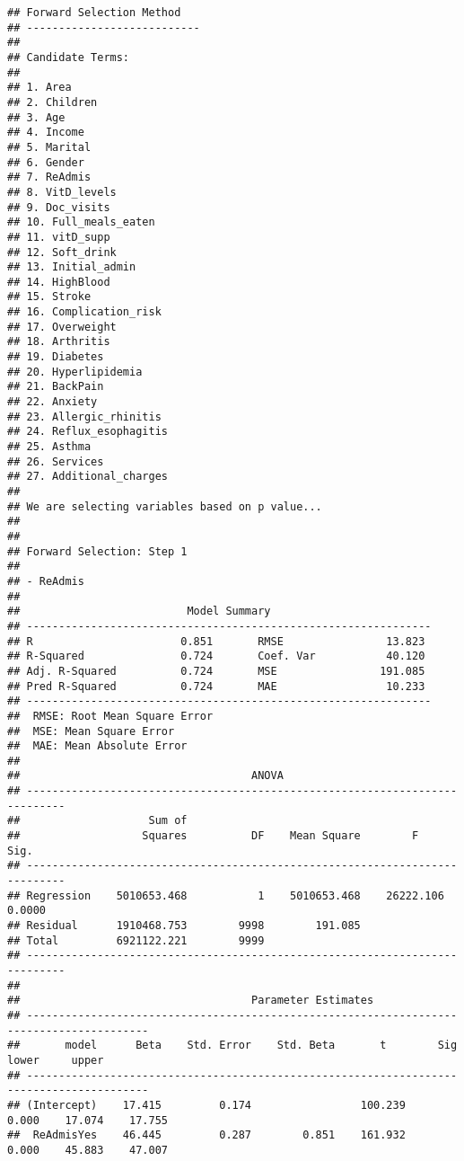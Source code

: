 \documentclass[
]{article}
\begin{document}
\begin{verbatim}
## Forward Selection Method    
## ---------------------------
## 
## Candidate Terms: 
## 
## 1. Area 
## 2. Children 
## 3. Age 
## 4. Income 
## 5. Marital 
## 6. Gender 
## 7. ReAdmis 
## 8. VitD_levels 
## 9. Doc_visits 
## 10. Full_meals_eaten 
## 11. vitD_supp 
## 12. Soft_drink 
## 13. Initial_admin 
## 14. HighBlood 
## 15. Stroke 
## 16. Complication_risk 
## 17. Overweight 
## 18. Arthritis 
## 19. Diabetes 
## 20. Hyperlipidemia 
## 21. BackPain 
## 22. Anxiety 
## 23. Allergic_rhinitis 
## 24. Reflux_esophagitis 
## 25. Asthma 
## 26. Services 
## 27. Additional_charges 
## 
## We are selecting variables based on p value...
## 
## 
## Forward Selection: Step 1 
## 
## - ReAdmis 
## 
##                          Model Summary                          
## ---------------------------------------------------------------
## R                       0.851       RMSE                13.823 
## R-Squared               0.724       Coef. Var           40.120 
## Adj. R-Squared          0.724       MSE                191.085 
## Pred R-Squared          0.724       MAE                 10.233 
## ---------------------------------------------------------------
##  RMSE: Root Mean Square Error 
##  MSE: Mean Square Error 
##  MAE: Mean Absolute Error 
## 
##                                    ANOVA                                     
## ----------------------------------------------------------------------------
##                    Sum of                                                   
##                   Squares          DF    Mean Square        F          Sig. 
## ----------------------------------------------------------------------------
## Regression    5010653.468           1    5010653.468    26222.106    0.0000 
## Residual      1910468.753        9998        191.085                        
## Total         6921122.221        9999                                       
## ----------------------------------------------------------------------------
## 
##                                    Parameter Estimates                                    
## -----------------------------------------------------------------------------------------
##       model      Beta    Std. Error    Std. Beta       t        Sig      lower     upper 
## -----------------------------------------------------------------------------------------
## (Intercept)    17.415         0.174                 100.239    0.000    17.074    17.755 
##  ReAdmisYes    46.445         0.287        0.851    161.932    0.000    45.883    47.007 

\end{verbatim}
\end{document}
